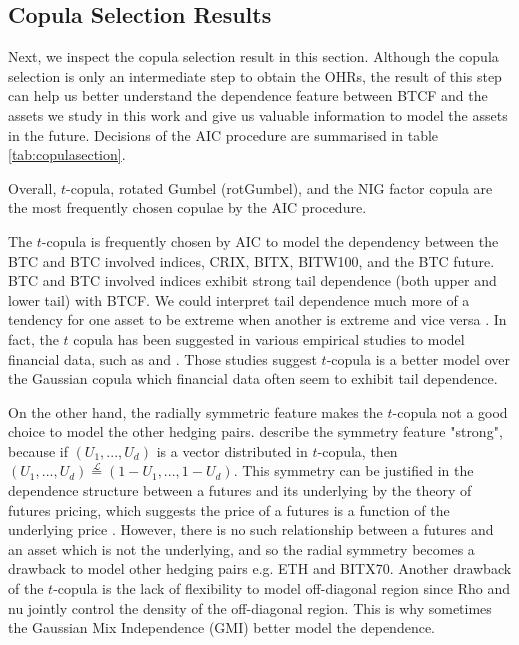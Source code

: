 \subsection{Copula Selection Results}\label{sec: copula results}
Next, we inspect the copula selection result in this section.
Although the copula selection is only an intermediate step to obtain the OHRs,
the result of this step can help us better understand the dependence feature between BTCF and the assets we study in this work and give us
valuable information to model the assets in the future.
Decisions of the AIC procedure are summarised in table \ref{tab:copulasection}. \medskip

Overall, $t$-copula, rotated Gumbel (rotGumbel), and the NIG factor copula are the most frequently chosen copulae by the AIC procedure. \medskip

The $t$-copula is frequently chosen by AIC to model the dependency between the BTC and BTC involved indices, CRIX, BITX, BITW100, and the BTC future.
BTC and BTC involved indices exhibit strong tail dependence (both upper and lower tail) with BTCF.
We could interpret tail dependence much more of a tendency for one asset to be extreme when another is extreme and vice versa \citep{McNeil2015}.
In fact, the $t$ copula has been suggested in various empirical studies to model financial data, such as \cite{zeevi2002beyond} and \cite{breymann2003dependence}.
Those studies suggest $t$-copula is a better model over the Gaussian copula which financial data often seem to exhibit tail dependence. \medskip

On the other hand, the radially symmetric feature makes the $t$-copula not a good choice to model the other hedging pairs.
\cite{demarta2005t} describe the symmetry feature "strong", because if $(U_1, ..., U_d)$ is a vector distributed in $t$-copula,
then $(U_1, ..., U_d) \overset{\mathcal{L}}= (1-U_1, ..., 1-U_d)$.
This symmetry can be justified in the dependence structure between a futures and its underlying by the theory of futures pricing,
which suggests the price of a futures is a function of the underlying price \citep{hull2003options}.
However, there is no such relationship between a futures and an asset which is not the underlying, and so the radial symmetry becomes a drawback to model other hedging pairs e.g. ETH and BITX70.
Another drawback of the $t$-copula is the lack of flexibility to model off-diagonal region since Rho and nu jointly control the density of the off-diagonal region.
This is why sometimes the Gaussian Mix Independence (GMI) better model the dependence.  \medskip

